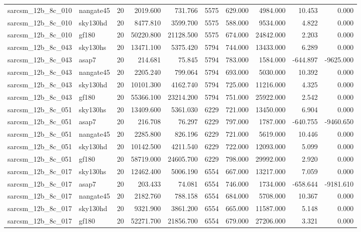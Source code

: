 \documentclass{article}
\begin{document}
\begin{longtable}{llrrrrrrrr}
sarcsm\_12b\_8c\_010 & nangate45 & 20 & 2019.600 & 731.766 & 5575 & 629.000 & 4984.000 & 10.453 & 0.000 \\
sarcsm\_12b\_8c\_010 & sky130hd & 20 & 8477.810 & 3599.700 & 5575 & 588.000 & 9534.000 & 4.822 & 0.000 \\
sarcsm\_12b\_8c\_010 & gf180 & 20 & 50220.800 & 21128.500 & 5575 & 674.000 & 24842.000 & 2.203 & 0.000 \\
sarcsm\_12b\_8c\_043 & sky130hs & 20 & 13471.100 & 5375.420 & 5794 & 744.000 & 13433.000 & 6.289 & 0.000 \\
sarcsm\_12b\_8c\_043 & asap7 & 20 & 214.681 & 75.845 & 5794 & 783.000 & 1584.000 & -644.897 & -9625.000 \\
sarcsm\_12b\_8c\_043 & nangate45 & 20 & 2205.240 & 799.064 & 5794 & 693.000 & 5030.000 & 10.392 & 0.000 \\
sarcsm\_12b\_8c\_043 & sky130hd & 20 & 10101.300 & 4162.740 & 5794 & 725.000 & 11216.000 & 4.325 & 0.000 \\
sarcsm\_12b\_8c\_043 & gf180 & 20 & 55366.100 & 23214.200 & 5794 & 751.000 & 25922.000 & 2.542 & 0.000 \\
sarcsm\_12b\_8c\_051 & sky130hs & 20 & 13409.600 & 5361.030 & 6229 & 721.000 & 13450.000 & 6.904 & 0.000 \\
sarcsm\_12b\_8c\_051 & asap7 & 20 & 216.708 & 76.297 & 6229 & 797.000 & 1787.000 & -640.755 & -9460.650 \\
sarcsm\_12b\_8c\_051 & nangate45 & 20 & 2285.800 & 826.196 & 6229 & 721.000 & 5619.000 & 10.446 & 0.000 \\
sarcsm\_12b\_8c\_051 & sky130hd & 20 & 10142.500 & 4211.540 & 6229 & 722.000 & 12093.000 & 5.099 & 0.000 \\
sarcsm\_12b\_8c\_051 & gf180 & 20 & 58719.000 & 24605.700 & 6229 & 798.000 & 29992.000 & 2.920 & 0.000 \\
sarcsm\_12b\_8c\_017 & sky130hs & 20 & 12462.400 & 5006.190 & 6554 & 667.000 & 13217.000 & 7.059 & 0.000 \\
sarcsm\_12b\_8c\_017 & asap7 & 20 & 203.433 & 74.081 & 6554 & 746.000 & 1734.000 & -658.644 & -9181.610 \\
sarcsm\_12b\_8c\_017 & nangate45 & 20 & 2182.760 & 788.158 & 6554 & 684.000 & 5708.000 & 10.367 & 0.000 \\
sarcsm\_12b\_8c\_017 & sky130hd & 20 & 9321.900 & 3861.200 & 6554 & 665.000 & 11587.000 & 5.148 & 0.000 \\
sarcsm\_12b\_8c\_017 & gf180 & 20 & 52271.700 & 21856.700 & 6554 & 679.000 & 27206.000 & 3.321 & 0.000 \\

\end{longtable}
\end{document}
